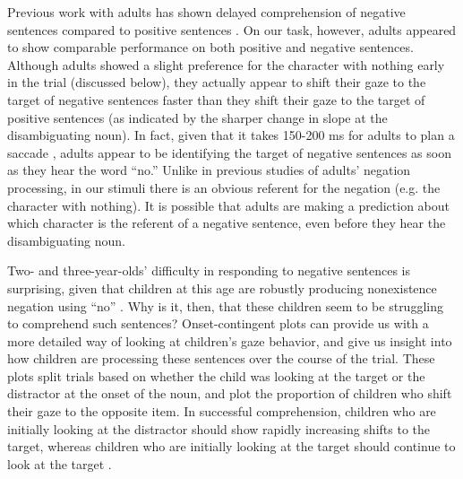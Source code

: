 \documentclass[man]{apa2}
\begin{document}
Previous work with adults has shown delayed comprehension of negative sentences compared to positive sentences \cite{hclark1972, just1971, just1976, carpenter1975}.  On our task, however, adults appeared to show comparable performance on both positive and negative sentences.  Although adults showed a slight preference for the character with nothing early in the trial (discussed below), they actually appear to shift their gaze to the target of negative sentences faster than they shift their gaze to the target of positive sentences (as indicated by the sharper change in slope at the disambiguating noun).  In fact, given that it takes 150-200 ms for adults to plan a saccade \cite{allopenna1998, rayner1998}, adults appear to be identifying the target of negative sentences as soon as they hear the word ``no.''  Unlike in previous studies of adults' negation processing, in our stimuli there is an obvious referent for the negation (e.g. the character with nothing).  It is possible that adults are making a prediction about which character is the referent of a negative sentence, even before they hear the disambiguating noun.   

Two- and three-year-olds' difficulty in responding to negative sentences is surprising, given that children at this age are robustly producing nonexistence negation using ``no'' \cite{bloom1970, pea1980}.  Why is it, then, that these children seem to be struggling to comprehend such sentences?  Onset-contingent plots can provide us with a more detailed way of looking at children's gaze behavior, and give us insight into how children are processing these sentences over the course of the trial.  These plots split trials based on whether the child was looking at the target or the distractor at the onset of the noun, and plot the proportion of children who shift their gaze to the opposite item.  In successful comprehension, children who are initially looking at the distractor should show rapidly increasing shifts to the target, whereas children who are initially looking at the target should continue to look at the target \cite{fernald2008}.  
\end{document}
